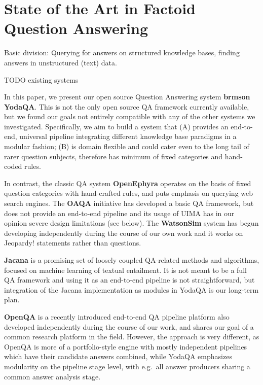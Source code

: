 \chapter{State of the Art in Factoid Question Answering}
\label{ch:survey}

Basic division:  Querying for answers on structured knowledge bases,
finding answers in unstructured (text) data.

TODO existing systems

In this paper, we present our open source Question Answering system
\textbf{brmson{\,\footnotesize\texttrademark{}} YodaQA}.  This is not the only open source QA framework
currently available, but we found our goals not entirely compatible
with any of the other systems we investigated.
Specifically, we aim to build a system that
(A) provides an end-to-end, universal pipeline integrating different
knowledge base paradigms in a modular fashion;
(B) is domain flexible and could cater even to the long tail of rarer
question subjects, therefore has minimum of fixed categories and hand-coded rules.

In contrast, the classic QA system \textbf{OpenEphyra} \cite{Ephyra2006}
operates on the basis of fixed question categories with hand-crafted rules,
and puts emphasis on querying web search engines.
The \textbf{OAQA} initiative \cite{OAQATowards} has developed a basic QA framework,
but does not provide an end-to-end pipeline and its usage of UIMA has
in our opinion severe design limitations (see below).
The \textbf{WatsonSim} system \cite{WatsonSim} has begun developing independently
during the course of our own work and it works on Jeopardy! statements rather
than questions.

\textbf{Jacana} \cite{TreeEdit2013Yao} \cite{TreeEditIR2013Yao}
is a promising set of loosely coupled QA-related methods
and algorithms, focused on machine learning of textual entailment.  It is
not meant to be a full QA framework and using it as an end-to-end pipeline
is not straightforward, but integration of the Jacana implementation as
modules in YodaQA is our long-term plan.

\textbf{OpenQA} \cite{OpenQA} is a recently introduced end-to-end QA pipeline platform
also developed independently during the course of our work, and shares our
goal of a common research platform in the field.  However, the approach
is very different, as OpenQA is more of a portfolio-style engine with
mostly independent pipelines which have their candidate answers combined,
while YodaQA emphasizes modularity on the pipeline stage level,
with e.g.\ all answer producers sharing a common answer analysis stage.



